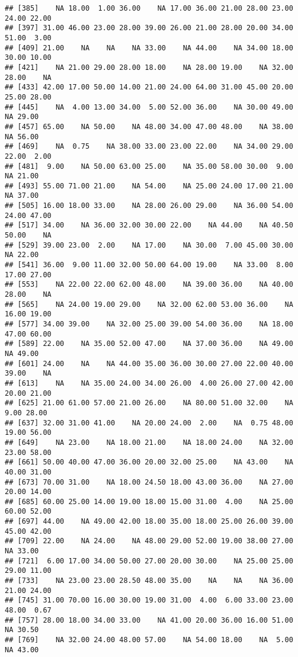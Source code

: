 \documentclass[
]{article}
\begin{document}
\begin{verbatim}
## [385]    NA 18.00  1.00 36.00    NA 17.00 36.00 21.00 28.00 23.00 24.00 22.00
## [397] 31.00 46.00 23.00 28.00 39.00 26.00 21.00 28.00 20.00 34.00 51.00  3.00
## [409] 21.00    NA    NA    NA 33.00    NA 44.00    NA 34.00 18.00 30.00 10.00
## [421]    NA 21.00 29.00 28.00 18.00    NA 28.00 19.00    NA 32.00 28.00    NA
## [433] 42.00 17.00 50.00 14.00 21.00 24.00 64.00 31.00 45.00 20.00 25.00 28.00
## [445]    NA  4.00 13.00 34.00  5.00 52.00 36.00    NA 30.00 49.00    NA 29.00
## [457] 65.00    NA 50.00    NA 48.00 34.00 47.00 48.00    NA 38.00    NA 56.00
## [469]    NA  0.75    NA 38.00 33.00 23.00 22.00    NA 34.00 29.00 22.00  2.00
## [481]  9.00    NA 50.00 63.00 25.00    NA 35.00 58.00 30.00  9.00    NA 21.00
## [493] 55.00 71.00 21.00    NA 54.00    NA 25.00 24.00 17.00 21.00    NA 37.00
## [505] 16.00 18.00 33.00    NA 28.00 26.00 29.00    NA 36.00 54.00 24.00 47.00
## [517] 34.00    NA 36.00 32.00 30.00 22.00    NA 44.00    NA 40.50 50.00    NA
## [529] 39.00 23.00  2.00    NA 17.00    NA 30.00  7.00 45.00 30.00    NA 22.00
## [541] 36.00  9.00 11.00 32.00 50.00 64.00 19.00    NA 33.00  8.00 17.00 27.00
## [553]    NA 22.00 22.00 62.00 48.00    NA 39.00 36.00    NA 40.00 28.00    NA
## [565]    NA 24.00 19.00 29.00    NA 32.00 62.00 53.00 36.00    NA 16.00 19.00
## [577] 34.00 39.00    NA 32.00 25.00 39.00 54.00 36.00    NA 18.00 47.00 60.00
## [589] 22.00    NA 35.00 52.00 47.00    NA 37.00 36.00    NA 49.00    NA 49.00
## [601] 24.00    NA    NA 44.00 35.00 36.00 30.00 27.00 22.00 40.00 39.00    NA
## [613]    NA    NA 35.00 24.00 34.00 26.00  4.00 26.00 27.00 42.00 20.00 21.00
## [625] 21.00 61.00 57.00 21.00 26.00    NA 80.00 51.00 32.00    NA  9.00 28.00
## [637] 32.00 31.00 41.00    NA 20.00 24.00  2.00    NA  0.75 48.00 19.00 56.00
## [649]    NA 23.00    NA 18.00 21.00    NA 18.00 24.00    NA 32.00 23.00 58.00
## [661] 50.00 40.00 47.00 36.00 20.00 32.00 25.00    NA 43.00    NA 40.00 31.00
## [673] 70.00 31.00    NA 18.00 24.50 18.00 43.00 36.00    NA 27.00 20.00 14.00
## [685] 60.00 25.00 14.00 19.00 18.00 15.00 31.00  4.00    NA 25.00 60.00 52.00
## [697] 44.00    NA 49.00 42.00 18.00 35.00 18.00 25.00 26.00 39.00 45.00 42.00
## [709] 22.00    NA 24.00    NA 48.00 29.00 52.00 19.00 38.00 27.00    NA 33.00
## [721]  6.00 17.00 34.00 50.00 27.00 20.00 30.00    NA 25.00 25.00 29.00 11.00
## [733]    NA 23.00 23.00 28.50 48.00 35.00    NA    NA    NA 36.00 21.00 24.00
## [745] 31.00 70.00 16.00 30.00 19.00 31.00  4.00  6.00 33.00 23.00 48.00  0.67
## [757] 28.00 18.00 34.00 33.00    NA 41.00 20.00 36.00 16.00 51.00    NA 30.50
## [769]    NA 32.00 24.00 48.00 57.00    NA 54.00 18.00    NA  5.00    NA 43.00

\end{verbatim}
\end{document}
